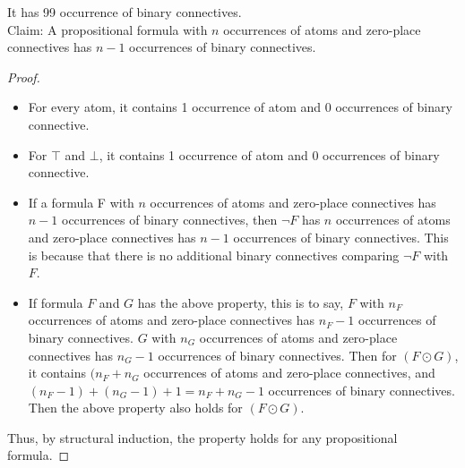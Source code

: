 \noindent
It has 99 occurrence of binary connectives. \\
Claim: A propositional formula with $n$ occurrences of atoms and zero-place connectives has $n - 1$ occurrences of binary connectives. 
\begin{proof}
\begin{itemize}
\item For every atom, it contains 1 occurrence of atom and 0 occurrences of binary connective. 
\item For $\top$ and $\bot$, it contains 1 occurrence of atom and 0 occurrences of binary connective. 
\item If a formula F with $n$ occurrences of atoms and zero-place connectives has $n - 1$ occurrences of binary connectives, then $\neg F$ has $n$ occurrences of atoms and zero-place connectives has $n - 1$ occurrences of binary connectives. This is because that there is no additional binary connectives comparing $\neg F$ with $F$. 
\item If formula $F$ and $G$ has the above property, this is to say, $F$ with $n_F$ occurrences of atoms and zero-place connectives has $n_F - 1$ occurrences of binary connectives. $G$ with $n_G$ occurrences of atoms and zero-place connectives has $n_G - 1$ occurrences of binary connectives. Then for $(F \odot G)$, it contains $(n_F + n_G$ occurrences of atoms and zero-place connectives, and $(n_F - 1) + (n_G - 1) + 1 = n_F + n_G - 1$ occurrences of binary connectives. Then the above property also holds for $(F \odot G)$. 
\end{itemize}
Thus, by structural induction, the property holds for any propositional formula. 
\end{proof} 
 
 \newpage
